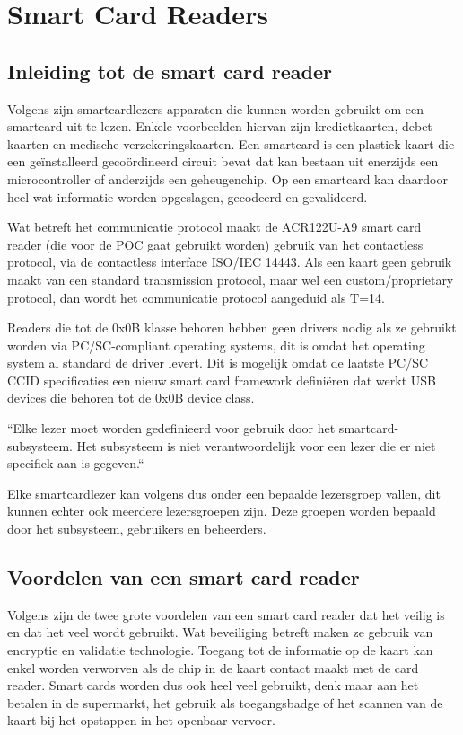 \section{Smart Card Readers}
\subsection{Inleiding tot de smart card reader}
Volgens \textcite{OnyaitOdekeCardReader} zijn smartcardlezers apparaten die kunnen worden gebruikt om een smartcard uit te lezen. Enkele voorbeelden hiervan zijn kredietkaarten, debet kaarten en medische verzekeringskaarten. Een smartcard is een plastiek kaart die een geïnstalleerd gecoördineerd circuit bevat dat kan bestaan uit enerzijds een microcontroller of anderzijds een geheugenchip. Op een smartcard kan daardoor heel wat informatie worden opgeslagen, gecodeerd en gevalideerd.

Wat betreft het communicatie protocol maakt de ACR122U-A9 smart card reader (die voor de POC gaat gebruikt worden) gebruik van het contactless protocol, via de contactless interface ISO/IEC 14443. Als een kaart geen gebruik maakt van een standard transmission protocol, maar wel een custom/proprietary protocol, dan wordt het communicatie protocol aangeduid als T=14.

Readers die tot de 0x0B klasse behoren hebben geen drivers nodig als ze gebruikt worden via PC/SC-compliant operating systems, dit is omdat het operating system al standard de driver levert. Dit is mogelijk omdat de laatste PC/SC CCID specificaties een nieuw smart card framework definiëren dat werkt USB devices die behoren tot de 0x0B device class.


``Elke lezer moet worden gedefinieerd voor gebruik door het smartcard-subsysteem. Het subsysteem is niet verantwoordelijk voor een lezer die er niet specifiek aan is gegeven.``\autocite{MicrosoftSmartCardReaders}

Elke smartcardlezer kan volgens \textcite{MicrosoftSmartCardReaders} dus onder een bepaalde lezersgroep vallen, dit kunnen echter ook meerdere lezersgroepen zijn. Deze groepen worden bepaald door het subsysteem, gebruikers en beheerders.

\subsection{Voordelen van een smart card reader}
Volgens \textcite{OnyaitOdekeCardReader} zijn de twee grote voordelen van een smart card reader dat het veilig is en dat het veel wordt gebruikt. Wat beveiliging betreft maken ze gebruik van encryptie en validatie technologie. Toegang tot de informatie op de kaart kan enkel worden verworven als de chip in de kaart contact maakt met de card reader. Smart cards worden dus ook heel veel gebruikt, denk maar aan het betalen in de supermarkt, het gebruik als toegangsbadge of het scannen van de kaart bij het opstappen in het openbaar vervoer.

